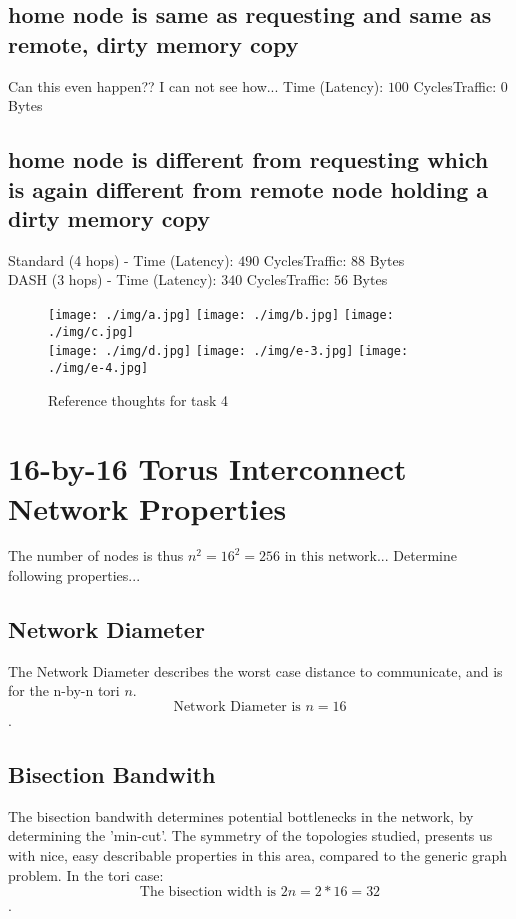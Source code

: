 \documentclass[a4paper,10pt]{article}
\begin{document}
\subsection{home node is same as requesting and same as remote, dirty memory copy}
Can this even happen?? I can not see how...
Time (Latency): $100$ Cycles\qquad Traffic: $0$ Bytes

\subsection{home node is different from requesting which is again different from remote node holding a dirty memory copy} \label{sec:dash}
Standard (4 hops) - Time (Latency): $490$ Cycles\qquad Traffic: $88$ Bytes \\
DASH (3 hops) - Time (Latency): $340$ Cycles\qquad Traffic: $56$ Bytes


\begin{figure}[h!]
 \centering
 \texttt{[image: ./img/a.jpg]}
 \texttt{[image: ./img/b.jpg]}
 \texttt{[image: ./img/c.jpg]} \\
 \vspace{2mm}
 \texttt{[image: ./img/d.jpg]}
 \texttt{[image: ./img/e-3.jpg]}
 \texttt{[image: ./img/e-4.jpg]}
 \caption{Reference thoughts for task 4}
 \label{fig:task4_solutions}
\end{figure}

\vfill

\section{16-by-16 Torus Interconnect Network Properties}
The number of nodes is thus $n^2 = 16^2 = 256$ in this network...
Determine following properties...

\subsection{Network Diameter}
The Network Diameter describes the worst case distance to communicate, and is for the n-by-n tori $n$.\\
$$ \text{Network Diameter is } n = 16$$.


\subsection{Bisection Bandwith}
The bisection bandwith determines potential bottlenecks in the network, by determining the 'min-cut'. The symmetry of the topologies studied, presents us with nice, easy describable properties in this area, compared to the generic graph problem. In the tori case: $$ \text{The bisection width is } 2n = 2*16 = 32$$. 
\end{document}
